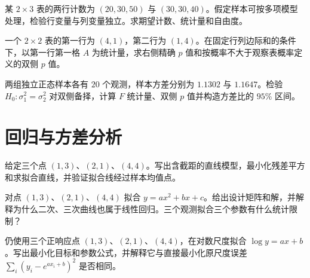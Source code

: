 \begin{exercise}[列联表独立性检验]\label{q:B15.3}
某 $2\times3$ 表的两行计数为 $(20,30,50)$ 与 $(30,30,40)$。假定样本可按多项模型处理，检验行变量与列变量独立。求期望计数、统计量和自由度。\par{}\end{exercise}

\begin{exercise}[小样本的费希尔精确检验]\label{q:B15.4}
一个 $2\times2$ 表的第一行为 $(4,1)$，第二行为 $(1,4)$。在固定行列边际和的条件下，以第一行第一格 $A$ 为统计量，求右侧精确 $p$ 值和按概率不大于观察表概率定义的双侧 $p$ 值。\par{}\end{exercise}

\begin{exercise}[两个正态方差的 F 检验]\label{q:M-P9-5}
两组独立正态样本各有 $20$ 个观测，样本方差分别为 $1.1302$ 与 $1.1647$。检验 $H_0:\sigma_1^2=\sigma_2^2$ 对双侧备择，计算 $F$ 统计量、双侧 $p$ 值并构造方差比的 $95\%$ 区间。\par{}\end{exercise}

\clearpage\section{回归与方差分析}

\begin{exercise}[三个点的最小二乘直线]\label{q:M-C26-1a}
给定三个点 $(1,3)$、$(2,1)$、$(4,4)$。写出含截距的直线模型，最小化残差平方和求拟合直线，并验证拟合线经过样本均值点。\par{}\end{exercise}

\begin{exercise}[二次多项式仍是线性回归]\label{q:M-C26-1b}
对点 $(1,3)$、$(2,1)$、$(4,4)$ 拟合 $y=ax^2+bx+c$。给出设计矩阵和解，并解释为什么二次、三次曲线也属于线性回归。三个观测拟合三个参数有什么统计限制？\par{}\end{exercise}

\begin{exercise}[对数尺度的指数拟合]\label{q:M-C26-1c}
仍使用三个正响应点 $(1,3)$、$(2,1)$、$(4,4)$，在对数尺度拟合 $\log y=ax+b$。写出最小化目标和参数公式，并解释它与直接最小化原尺度误差 $\sum_i(y_i-e^{ax_i+b})^2$ 是否相同。\par{}\end{exercise}

